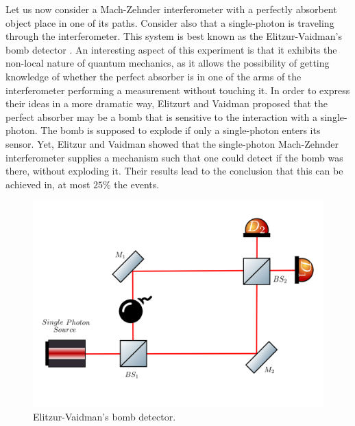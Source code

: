 \documentclass{book}
\begin{document}
Let us now consider a Mach-Zehnder interferometer with a perfectly absorbent object place in one of its paths. Consider also that a single-photon is traveling through the interferometer. This system is best known as the Elitzur-Vaidman's bomb detector \cite{Elitzur}. An interesting aspect of this experiment is that it exhibits the non-local nature of quantum mechanics, as it allows the possibility of getting knowledge of whether the perfect absorber is in one of the arms of the interferometer performing a measurement without touching it. In order to express their ideas in a more dramatic way, Elitzurt and Vaidman proposed that the perfect absorber may be a bomb that is sensitive to the interaction with a single-photon. The bomb is supposed to explode if only a single-photon enters its sensor. Yet, Elitzur and Vaidman showed that the single-photon Mach-Zehnder interferometer supplies a mechanism such that one could detect if the bomb was there, without exploding it. Their results lead to the conclusion that this can be achieved in, at most $25\%$ the events.


\begin{figure}[h!]
\centering
\includegraphics[width=\linewidth]{images/machzenhderbomb.png}
\caption{Elitzur-Vaidman's bomb detector.}
\label{fig:bomb}
\end{figure}
\end{document}
